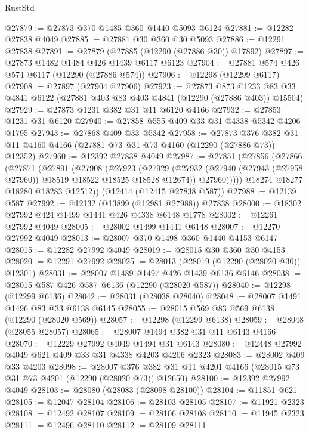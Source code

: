 \begin{lexlean}{RustStd}
\begin{coremodule}
@27879 := @27873 @370 @1485 @360 @1440 @5093 @6124
@27881 := @12282 @27838 @4049
@27885 := @27881 @30 @360 @30 @5093
@27886 := @12291 @27838
@27891 := @27879 (@27885 (@12290 (@27886 @30)) @17892)
@27897 := @27873 @1482 @1484 @426 @1439 @6117 @6123
@27904 := @27881 @574 @426 @574 @6117 (@12290 (@27886 @574))
@27906 := @12298 (@12299 @6117)
@27908 := @27897 (@27904 @27906)
@27923 := @27873
    @873
    @1233
    @83
    @33
    @4841
    @6122
    (@27881 @403 @83 @403 @4841 (@12290 (@27886 @403)) @15504)
@27929 := @27873 @1231 @382 @31 @11 @6120 @4166
@27932 := @27853 @1231 @31 @6120
@27940 := @27858 @555 @409 @33 @31 @4338 @5342 @4206 @1795
@27943 := @27868 @409 @33 @5342
@27958 := @27873
    @376
    @382
    @31
    @11
    @4160
    @4166
    (@27881 @73 @31 @73 @4160 (@12290 (@27886 @73)) @12352)
@27960 := @12392 @27838 @4049
@27987 := @27851
    (@27856
      (@27866
        (@27871
          (@27891
            (@27908
              (@27923
                (@27929
                  (@27932 (@27940 (@27943 (@27958 @27960)) @18519 @18522 @18525 @18528 @12674))
                  @27960)))))
        @18274
        @18277
        @18280
        @18283
        @12512))
    (@12414 (@12415 @27838 @587))
@27988 := @12139 @587
@27992 := @12132 (@13899 (@12981 @27988)) @27838
@28000 := @18302 @27992 @424 @1499 @1441 @426 @4338 @6148 @1778
@28002 := @12261 @27992 @4049
@28005 := @28002 @1499 @1441 @6148
@28007 := @12270 @27992 @4049
@28013 := @28007 @370 @1498 @360 @1440 @4153 @6147
@28015 := @12282 @27992 @4049
@28019 := @28015 @30 @360 @30 @4153
@28020 := @12291 @27992
@28025 := @28013 (@28019 (@12290 (@28020 @30)) @12301)
@28031 := @28007 @1489 @1497 @426 @1439 @6136 @6146
@28038 := @28015 @587 @426 @587 @6136 (@12290 (@28020 @587))
@28040 := @12298 (@12299 @6136)
@28042 := @28031 (@28038 @28040)
@28048 := @28007 @1491 @1496 @83 @33 @6138 @6145
@28055 := @28015 @569 @83 @569 @6138 (@12290 (@28020 @569))
@28057 := @12298 (@12299 @6138)
@28059 := @28048 (@28055 @28057)
@28065 := @28007 @1494 @382 @31 @11 @6143 @4166
@28070 := @12229 @27992 @4049 @1494 @31 @6143
@28080 := @12448 @27992 @4049 @621 @409 @33 @31 @4338 @4203 @4206 @2323
@28083 := @28002 @409 @33 @4203
@28098 := @28007
    @376
    @382
    @31
    @11
    @4201
    @4166
    (@28015 @73 @31 @73 @4201 (@12290 (@28020 @73)) @12650)
@28100 := @12392 @27992 @4049
@28103 := @28080 (@28083 (@28098 @28100))
@28104 := @11851 @621
@28105 := @12047 @28104
@28106 := @28103 @28105
@28107 := @11921 @2323
@28108 := @12492 @28107
@28109 := @28106 @28108
@28110 := @11945 @2323
@28111 := @12496 @28110
@28112 := @28109 @28111

\end{coremodule}
\end{lexlean}
